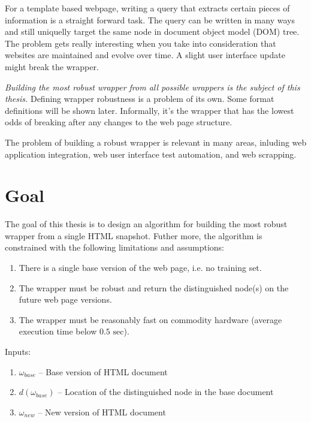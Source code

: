 For a template based webpage, writing a query that extracts certain pieces of information is a straight forward task. The query can be written in many ways and still uniquelly target the same node in document object model (DOM) tree. The problem gets really interesting when you take into consideration that websites are maintained and evolve over time. A slight user interface update might break the wrapper.

\textit{Building the most robust wrapper from all possible wrappers is the subject of this thesis.} Defining wrapper robustness is a problem of its own. Some format definitions will be shown later. Informally, it's the wrapper that has the lowest odds of breaking after any changes to the web page structure.

The problem of building a robust wrapper is relevant in many areas, inluding web application integration, web user interface test automation, and web scrapping.


\section{Goal}


The goal of this thesis is to design an algorithm for building the most robust wrapper from a single HTML snapshot. Futher more, the algorithm is constrained with the following limitations and assumptions:

\begin{enumerate}
	\item There is a single base version of the web page, i.e. no training set.
	\item The wrapper must be robust and return the distinguished node(s) on the future web page versions.
	\item The wrapper must be reasonably fast on commodity hardware (average execution time below $0.5\text{ sec}$).
\end{enumerate}

Inputs: 

\begin{enumerate}
	\item $\omega_{base}$ -- Base version of HTML document 
	\item $d(\omega_{base})$ -- Location of the distinguished node in the base document 
	\item $\omega_{new}$ -- New version of HTML document 
\end{enumerate}

